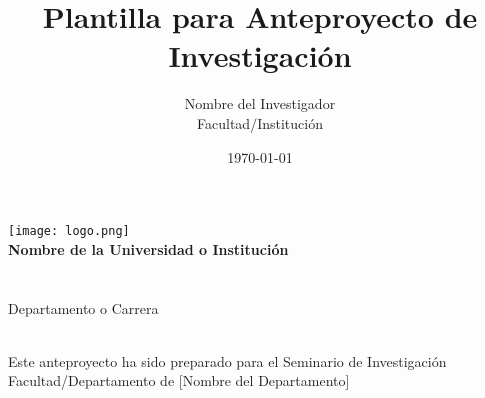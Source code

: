 \documentclass[12pt,a4paper]{article}
\title{\textbf{Plantilla para Anteproyecto de Investigación}}
\author{Nombre del Investigador \\ Facultad/Institución}
\date{\today}
\begin{document}
\begin{titlepage}
  \thispagestyle{empty}  %
  \begin{center}
    \vspace*{1cm}
    \texttt{[image: logo.png]}\\[1cm]
    
    {\Large \textbf{Nombre de la Universidad o Institución}}\\[0.5cm]
    
    {\Huge \bfseries \thetitle}\\[1.5cm]
    
    {\Large \textbf{\theauthor}}\\[0.5cm]
    
    {\large Departamento o Carrera}\\[0.5cm]
    
    {\large \thedate}\\[2cm]
    
    
    \vfill
    {\small Este anteproyecto ha sido preparado para el Seminario de Investigación}\\
    {\small Facultad/Departamento de [Nombre del Departamento]}
  \end{center}
\end{titlepage}

\maketitle
\thispagestyle{empty}  %

\tableofcontents
\newpage

\end{document}
